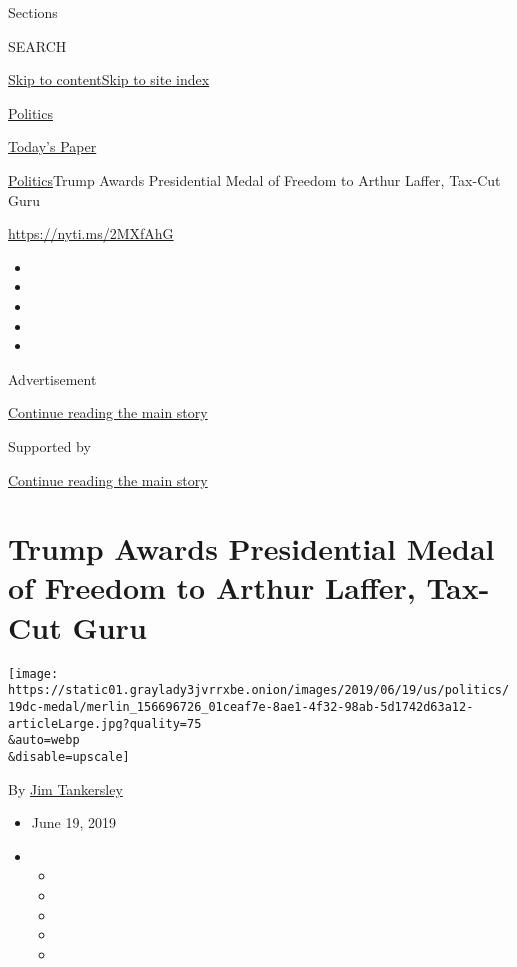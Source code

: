 Sections

SEARCH

\protect\hyperlink{site-content}{Skip to
content}\protect\hyperlink{site-index}{Skip to site index}

\href{https://www.nytimes3xbfgragh.onion/section/politics}{Politics}

\href{https://myaccount.nytimes3xbfgragh.onion/auth/login?response_type=cookie\&client_id=vi}{}

\href{https://www.nytimes3xbfgragh.onion/section/todayspaper}{Today's
Paper}

\href{/section/politics}{Politics}\textbar{}Trump Awards Presidential
Medal of Freedom to Arthur Laffer, Tax-Cut Guru

\url{https://nyti.ms/2MXfAhG}

\begin{itemize}
\item
\item
\item
\item
\item
\end{itemize}

Advertisement

\protect\hyperlink{after-top}{Continue reading the main story}

Supported by

\protect\hyperlink{after-sponsor}{Continue reading the main story}

\hypertarget{trump-awards-presidential-medal-of-freedom-to-arthur-laffer-tax-cut-guru}{%
\section{Trump Awards Presidential Medal of Freedom to Arthur Laffer,
Tax-Cut
Guru}\label{trump-awards-presidential-medal-of-freedom-to-arthur-laffer-tax-cut-guru}}

\texttt{[image: https://static01.graylady3jvrrxbe.onion/images/2019/06/19/us/politics/19dc-medal/merlin\_156696726\_01ceaf7e-8ae1-4f32-98ab-5d1742d63a12-articleLarge.jpg?quality=75\\\&auto=webp\\\&disable=upscale]}

By \href{https://www.nytimes3xbfgragh.onion/by/jim-tankersley}{Jim
Tankersley}

\begin{itemize}
\item
  June 19, 2019
\item
  \begin{itemize}
  \item
  \item
  \item
  \item
  \item
  \end{itemize}
\end{itemize}

